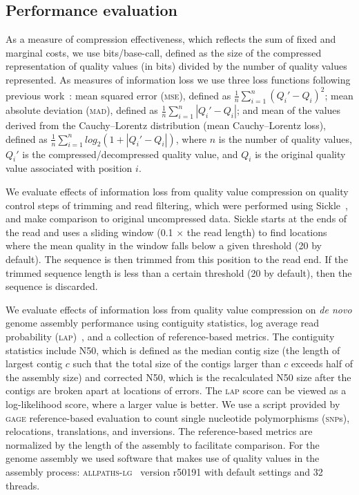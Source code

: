 \documentclass{bmcart}
\begin{document}
\subsection*{Performance evaluation}

As a measure of compression effectiveness, which reflects the sum of
fixed and marginal costs, we use bits/base-call, defined as the size
of the compressed representation of quality values (in bits) divided
by the number of quality values represented. As measures of
information loss we use three loss functions following previous
work~\cite{Malysa01102015}: mean squared error (\textsc{mse}), defined
as $\frac{1}{n}\sum_{i=1}^{n}{(Q_i'-Q_i)^2}$; mean absolute deviation
(\textsc{mad}), defined as $\frac{1}{n}\sum_{i=1}^{n}{|Q_i'-Q_i|}$;
and mean of the values derived from the Cauchy--Lorentz distribution
(mean Cauchy--Lorentz loss), defined as
$\frac{1}{n}\sum_{i=1}^{n}{log_{2}(1 + |Q_i'-Q_i|)}$, where $n$ is the
number of quality values, $Q_i'$ is the compressed/decompressed
quality value, and $Q_i$ is the original quality value associated with
position $i$.

We evaluate effects of information loss from quality value compression
on quality control steps of trimming and read filtering, which were
performed using Sickle~\cite{sickle}, and make comparison to original
uncompressed data. Sickle starts at the ends of the read and uses a
sliding window (0.1 $\times$ the read length) to find locations where
the mean quality in the window falls below a given threshold (20 by
default). The sequence is then trimmed from this position to the read
end. If the trimmed sequence length is less than a certain threshold
(20 by default), then the sequence is discarded.

We evaluate effects of information loss from quality value compression
on \emph{de novo} genome assembly performance using contiguity
statistics, log average read probability
(\textsc{lap})~\cite{Ghodsi:2013hb}, and a collection of
reference-based metrics. The contiguity statistics include N50, which
is defined as the median contig size (the length of largest contig $c$
such that the total size of the contigs larger than $c$ exceeds half
of the assembly size) and corrected N50, which is the recalculated N50
size after the contigs are broken apart at locations of errors. The
\textsc{lap} score can be viewed as a log-likelihood score, where a
larger value is better. We use a script provided by \textsc{gage}
reference-based evaluation to count single nucleotide polymorphisms
(\textsc{snp}s), relocations, translations, and inversions. The
reference-based metrics are normalized by the length of the assembly
to facilitate comparison. For the genome assembly we used software
that makes use of quality values in the assembly process:
\textsc{allpaths-lg}~\cite{Gnerre:2011kx} version r50191 with default
settings and 32 threads.
\end{document}
